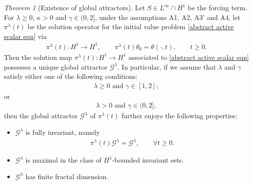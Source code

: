 \documentclass[reqno]{amsart}%
\theoremstyle{definition}
\theoremstyle{remark}
\numberwithin{equation}{section}
\newtheorem{theorem}{Theorem}
\newcommand{\1}{\mathbf{1}}
\newcommand{\Gg}{\mathcal{G}^{\lambda}}
\newcommand{\pin}{\pi^{\lambda}}
\numberwithin{equation}{section}
\numberwithin{theorem}{section}
\numberwithin{figure}{section}
\begin{document}
\begin{theorem}[Existence of global attractors]\label{existence of global attractor theorem}
Let $S\in L^\infty\cap H^1$ be the forcing term. For $\lambda\ge0$, $\kappa>0$ and $\gamma\in(0,2]$, under the assumptions A1, A2, A3' and A4, let $\pin(t)$ be the solution operator for the initial value problem \eqref{abstract active scalar eqn} via
\begin{align*}
\pin(t): H^1\to H^1,\qquad \pin(t)\theta_0=\theta(\cdot,t),\qquad t\ge0.
\end{align*}
Then the solution map $\pin(t):H^1\to H^1$ associated to \eqref{abstract active scalar eqn} possesses a unique global attractor $\Gg$. In particular, if we assume that $\lambda$ and $\gamma$ satisfy either one of the following conditions:
\begin{align*}
\mbox{$\lambda\ge0$ and $\gamma\in[1,2]$};
\end{align*}
or
\begin{align*}
\mbox{$\lambda>0$ and $\gamma\in(0,2]$},
\end{align*}
then the global attractor $\Gg$ of $\pin(t)$ further enjoys the following properties:
\begin{itemize}
\item $\Gg$ is fully invariant, namely
\begin{align*}
\pin(t)\Gg=\Gg,\qquad \forall t\ge0.
\end{align*}
\item $\Gg$ is maximal in the class of $H^1$-bounded invariant sets.
\item $\Gg$ has finite fractal dimension.
\end{itemize}
\end{theorem}
\end{document}

